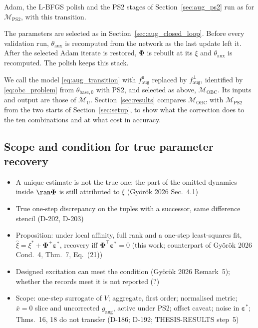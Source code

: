 Adam, the L-BFGS polish and the PS2 stages of Section~\ref{sec:aug_ps2} run as
for $\mathcal M_{\mathrm{PS2}}$, with this transition.

The parameters are selected as in Section~\ref{sec:aug_closed_loop}.
Before every validation run, $\theta_{\mathrm{aux}}$ is recomputed from the
network as the last update left it.
After the selected Adam iterate is restored, $\boldsymbol\Phi$ is rebuilt at
its $\xi$ and $\theta_{\mathrm{aux}}$ is recomputed.
The polish keeps this stack.

We call the model \eqref{eq:aug_transition} with
$f^{\mathrm n}_{\mathrm{aug}}$ replaced by $f^{\perp}_{\mathrm{aug}}$,
identified by \eqref{eq:obc_problem} from $\theta_{\mathrm{base},0}$ with PS2,
and selected as above, $\mathcal M_{\mathrm{OBC}}$.
Its inputs and output are those of $\mathcal M_{\mathrm U}$.
Section~\ref{sec:results} compares $\mathcal M_{\mathrm{OBC}}$ with
$\mathcal M_{\mathrm{PS2}}$ from the two starts of Section~\ref{sec:setup}, to
show what the correction does to the ten combinations and at what cost in
accuracy.

\subsection{Scope and condition for true parameter recovery}\label{sec:obc_scope}
\ifdraft
\begin{itemize}
\item A unique estimate is not the true one: the part of the omitted dynamics inside $\ran\boldsymbol\Phi$ is still attributed to $\xi$ (Gy\"or\"ok 2026 Sec.~4.1)
\item True one-step discrepancy on the tuples with a successor, same difference stencil (D-202, D-203)
\item Proposition: under local affinity, full rank and a one-step least-squares fit, $\hat\xi=\xi^*+\boldsymbol\Phi^{+}\boldsymbol\varepsilon^*$, recovery iff $\boldsymbol\Phi^\top\boldsymbol\varepsilon^*=0$ (this work; counterpart of Gy\"or\"ok 2026 Cond.~4, Thm.~7, Eq.~(21))
\item Designed excitation can meet the condition (Gy\"or\"ok 2026 Remark~5); whether the records meet it is not reported (?)
\item Scope: one-step surrogate of $V$; aggregate, first order; normalised metric; $\bar x=0$ slice and uncorrected $g_{\mathrm{aug}}$, active under PS2; offset caveat; noise in $\boldsymbol\varepsilon^*$; Thms.~16, 18 do not transfer (D-186; D-192; THESIS-RESULTS step~5)
\end{itemize}
\fi

